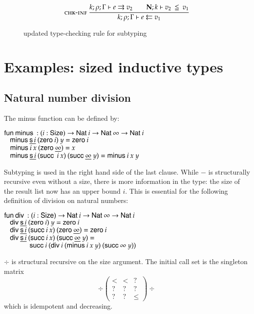 \begin{figure}[htp]

\begin{gather*}
\mbox{\sc chk-inf}\ \dfrac{k;\rho;\Gamma\vdash e\rightrightarrows v_2
\qquad
{\mathbf{N};k\vdash v_2\:\leqq\:v_1}}{k;\rho;\Gamma\vdash e\leftleftarrows v_1}
\end{gather*}
\caption{updated type-checking rule for subtyping}
\label{fnews}
\end{figure}

\section{Examples: sized inductive types }

\subsection{Natural number division}

The minus function can be defined by:
\begin{bsp}
$\mathsf{fun}\: \mathsf{minus}\: : (i : \mathsf{Size} ) \rightarrow \mathsf{Nat}\: i \rightarrow \mathsf{Nat}\: \infty \rightarrow \mathsf{Nat}\: i$\\
$\hspace*{3mm} \mathsf{minus}\: \underline{\mathsf{s}\, i} \: (\mathsf{zero}\: i) \:  y = \mathsf{zero}\: i $ \\
$\hspace*{3mm} \mathsf{minus}\: i \: x \: (\mathsf{zero}\: \underline{\infty})  = x $\\
$\hspace*{3mm} \mathsf{minus}\: \underline{\mathsf{s}\, i} \: (\mathsf{succ}\: \: i \: x) \: (\mathsf{succ}\: \underline{\infty} \: y) = \mathsf{minus}\: i \: x \: y $
\end{bsp}
Subtyping is used in the right hand side of the last clause.
While $\minus$ is structurally recursive even without a size, 
there is more information in the type: the size of the result list now has an upper bound $i$.
This is essential for the following definition of division on natural numbers:
\begin{bsp}
$\mathsf{fun}\: \mathsf{div}\: : ( i : \mathsf{Size} )  \rightarrow  \mathsf{Nat}\: i \rightarrow \mathsf{Nat}\: \infty \rightarrow \mathsf{Nat}\: i$\\
$\hspace*{3mm} \mathsf{div}\: \underline{\mathsf{s}\, i} \: (\mathsf{zero}\: i) \: y = \mathsf{zero}\: i$\\
$\hspace*{3mm} \mathsf{div}\: \underline{\mathsf{s}\, i} \: (\mathsf{succ}\: i \: x) \: (\mathsf{zero}\: \underline{\infty})  = \mathsf{zero}\: i$\\
$\hspace*{3mm} \mathsf{div}\: \underline{\mathsf{s}\, i} \: (\mathsf{succ}\: i \: x) \: (\mathsf{succ}\: \underline{\infty} \: y) = $\\
$\spc \spcx \suc i \: (\div i \: (\minus i \: x \:y) \: (\suc \infty \: y))$
\end{bsp}
$\div$ is structural recursive on the size argument.
The initial call set is the singleton matrix
\[
\div
\begin{pmatrix}
<    &  <  & ? \\
?    &  ?  &  ? \\
?    &  ?  & \leq 
\end{pmatrix}\div
\] 
which is idempotent and decreasing.

